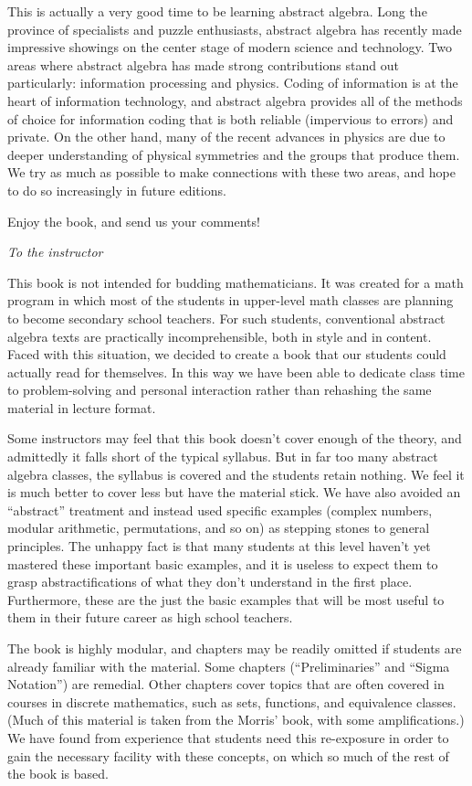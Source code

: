 This is actually a very good time to be learning abstract algebra. Long the province of specialists and puzzle enthusiasts, abstract algebra has recently made  impressive showings on the center stage of modern  science and technology. Two areas where abstract algebra has made strong contributions stand out particularly: information processing and physics. Coding of information is at the heart of information technology, and abstract algebra provides all of the methods of choice for information coding that is both reliable (impervious to errors) and private.  
On the other hand,  many of the recent advances in  physics are due to deeper understanding of physical symmetries and the groups that produce them. We try as much as possible to make connections with these two areas, and hope to do so increasingly in future editions. 

Enjoy the book, and send us your comments!
\medskip

\noindent
\emph{To the instructor}
\smallskip

This book  is not intended for budding mathematicians. It was created for a math program in which most of the students in upper-level math classes are planning to become secondary school teachers. For such students, conventional abstract algebra texts are practically  incomprehensible, both in style and in content. Faced with this situation, we decided to create a book that our students could actually read for themselves. In this way we have been able to dedicate class time to problem-solving and personal  interaction rather than rehashing the same material in lecture format.

Some instructors may feel that this book doesn't cover enough of the theory, and admittedly it falls short of the typical syllabus. But in far too many abstract algebra classes, the syllabus is covered and the students retain nothing. We feel it is much better to cover less but have the material stick. We have also avoided an ``abstract'' treatment and instead used specific examples (complex numbers, modular arithmetic, permutations, and so on) as stepping stones to general principles. The unhappy fact is that many students at this level haven't yet mastered these important basic examples, and it is useless to expect them to grasp abstractifications of what they don't understand in the first place. Furthermore, these are the just the basic examples that will be most useful to them in their future career as high school teachers.

The book is highly modular, and chapters may be readily omitted if students are already familiar with the material. Some chapters  (``Preliminaries'' and ``Sigma Notation'') are remedial. Other chapters cover topics that are often covered in courses in discrete mathematics, such as sets, functions, and equivalence classes. (Much of this material is taken from the Morris' book, with some amplifications.) We have found from experience that students need this re-exposure in order to gain the necessary facility with these concepts, on which so much of the rest of the book is based.

